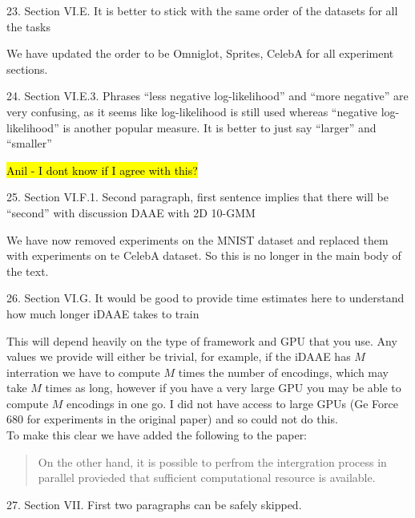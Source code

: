\documentclass{article}
\begin{document}
{\color{blue}
23. Section VI.E. It is better to stick with the same order of the datasets for all the tasks\\
}

{\color{red} We have updated the order to be Omniglot, Sprites, CelebA for all experiment sections.\\}

{\color{blue}
24. Section VI.E.3. Phrases ``less negative log-likelihood'' and ``more negative'' are very confusing, as it seems like log-likelihood is still used whereas ``negative log-likelihood'' is another popular measure. It is better to just say ``larger'' and ``smaller''\\
}

\hl{Anil - I dont know if I agree with this?\\}


{\color{blue}
25. Section VI.F.1. Second paragraph, first sentence implies that there will be ``second'' with discussion DAAE with 2D 10-GMM\\
}

{\color{red} We have now removed experiments on the MNIST dataset and replaced them with experiments on te CelebA dataset. So this is no longer in the main body of the text.\\}

{\color{blue}
26. Section VI.G. It would be good to provide time estimates here to understand how much longer iDAAE takes to train\\
}

{\color{red} This will depend heavily on the type of framework and GPU that you use. Any values we provide will either be trivial, for example, if the iDAAE has $M$ interration we have to compute $M$ times the number of encodings, which may take $M$ times as long, however if you have a very large GPU you may be able to compute $M$ encodings in one go. I did not have access to large GPUs (Ge Force 680 for experiments in the original paper) and so could not do this.\\

To make this clear we have added the following to the paper:

\begin{quote}
 On the other hand, it is possible to perfrom the intergration process in parallel provieded that sufficient computational resource is available.
\end{quote}}

{\color{blue}
27. Section VII. First two paragraphs can be safely skipped.\\
}
\end{document}
